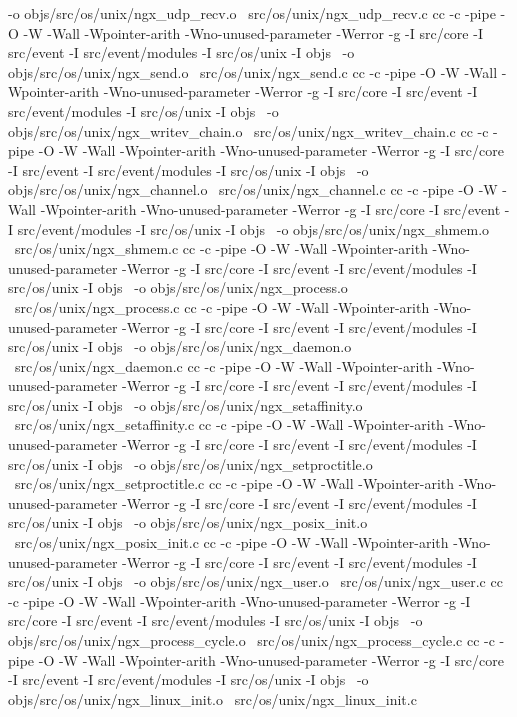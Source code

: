 	-o objs/src/os/unix/ngx_udp_recv.o \
	src/os/unix/ngx_udp_recv.c
cc -c -pipe  -O -W -Wall -Wpointer-arith -Wno-unused-parameter -Werror -g  -I src/core -I src/event -I src/event/modules -I src/os/unix -I objs \
	-o objs/src/os/unix/ngx_send.o \
	src/os/unix/ngx_send.c
cc -c -pipe  -O -W -Wall -Wpointer-arith -Wno-unused-parameter -Werror -g  -I src/core -I src/event -I src/event/modules -I src/os/unix -I objs \
	-o objs/src/os/unix/ngx_writev_chain.o \
	src/os/unix/ngx_writev_chain.c
cc -c -pipe  -O -W -Wall -Wpointer-arith -Wno-unused-parameter -Werror -g  -I src/core -I src/event -I src/event/modules -I src/os/unix -I objs \
	-o objs/src/os/unix/ngx_channel.o \
	src/os/unix/ngx_channel.c
cc -c -pipe  -O -W -Wall -Wpointer-arith -Wno-unused-parameter -Werror -g  -I src/core -I src/event -I src/event/modules -I src/os/unix -I objs \
	-o objs/src/os/unix/ngx_shmem.o \
	src/os/unix/ngx_shmem.c
cc -c -pipe  -O -W -Wall -Wpointer-arith -Wno-unused-parameter -Werror -g  -I src/core -I src/event -I src/event/modules -I src/os/unix -I objs \
	-o objs/src/os/unix/ngx_process.o \
	src/os/unix/ngx_process.c
cc -c -pipe  -O -W -Wall -Wpointer-arith -Wno-unused-parameter -Werror -g  -I src/core -I src/event -I src/event/modules -I src/os/unix -I objs \
	-o objs/src/os/unix/ngx_daemon.o \
	src/os/unix/ngx_daemon.c
cc -c -pipe  -O -W -Wall -Wpointer-arith -Wno-unused-parameter -Werror -g  -I src/core -I src/event -I src/event/modules -I src/os/unix -I objs \
	-o objs/src/os/unix/ngx_setaffinity.o \
	src/os/unix/ngx_setaffinity.c
cc -c -pipe  -O -W -Wall -Wpointer-arith -Wno-unused-parameter -Werror -g  -I src/core -I src/event -I src/event/modules -I src/os/unix -I objs \
	-o objs/src/os/unix/ngx_setproctitle.o \
	src/os/unix/ngx_setproctitle.c
cc -c -pipe  -O -W -Wall -Wpointer-arith -Wno-unused-parameter -Werror -g  -I src/core -I src/event -I src/event/modules -I src/os/unix -I objs \
	-o objs/src/os/unix/ngx_posix_init.o \
	src/os/unix/ngx_posix_init.c
cc -c -pipe  -O -W -Wall -Wpointer-arith -Wno-unused-parameter -Werror -g  -I src/core -I src/event -I src/event/modules -I src/os/unix -I objs \
	-o objs/src/os/unix/ngx_user.o \
	src/os/unix/ngx_user.c
cc -c -pipe  -O -W -Wall -Wpointer-arith -Wno-unused-parameter -Werror -g  -I src/core -I src/event -I src/event/modules -I src/os/unix -I objs \
	-o objs/src/os/unix/ngx_process_cycle.o \
	src/os/unix/ngx_process_cycle.c
cc -c -pipe  -O -W -Wall -Wpointer-arith -Wno-unused-parameter -Werror -g  -I src/core -I src/event -I src/event/modules -I src/os/unix -I objs \
	-o objs/src/os/unix/ngx_linux_init.o \
	src/os/unix/ngx_linux_init.c
